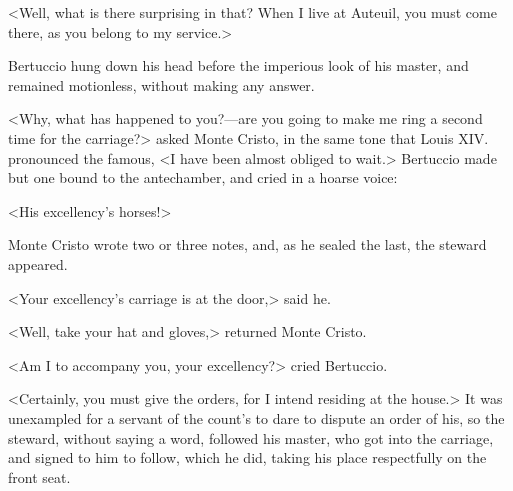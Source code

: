  <Well, what is there surprising in that? When I live at Auteuil, you must come there, as you belong to my service.> 

 Bertuccio hung down his head before the imperious look of his master, and remained motionless, without making any answer. 

 <Why, what has happened to you?—are you going to make me ring a second time for the carriage?> asked Monte Cristo, in the same tone that Louis XIV. pronounced the famous, <I have been almost obliged to wait.> Bertuccio made but one bound to the antechamber, and cried in a hoarse voice: 

 <His excellency's horses!> 

 Monte Cristo wrote two or three notes, and, as he sealed the last, the steward appeared. 

 <Your excellency's carriage is at the door,> said he. 

 <Well, take your hat and gloves,> returned Monte Cristo. 

 <Am I to accompany you, your excellency?> cried Bertuccio. 

 <Certainly, you must give the orders, for I intend residing at the house.>  It was unexampled for a servant of the count's to dare to dispute an order of his, so the steward, without saying a word, followed his master, who got into the carriage, and signed to him to follow, which he did, taking his place respectfully on the front seat. 